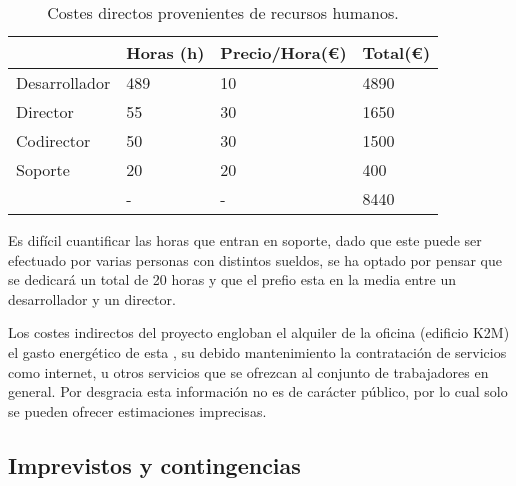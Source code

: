 \begin{table}[H]
\begin{tabular}{l|l|l|l|}
\cline{2-4}
                                                    & Horas (h) & Precio/Hora(\euro) & Total(\euro) \\ \hline
\multicolumn{1}{|l|}{Desarrollador}                 & 489       & 10               & 4890     \\ \hline
\multicolumn{1}{|l|}{Director}                      & 55        & 30               & 1650     \\ \hline
\multicolumn{1}{|l|}{Codirector}                    & 50        & 30               & 1500     \\ \hline
\multicolumn{1}{|l|}{Soporte}                       & 20        & 20               & 400      \\ \hline
\rowcolor{gray!50}
\multicolumn{1}{|l|}{Total} &    -       &  -              &  8440        \\ \hline
\end{tabular}
\caption{Costes directos provenientes de recursos humanos.}
\end{table}

Es difícil cuantificar las horas que entran en soporte, dado que este puede ser efectuado por varias personas con distintos sueldos, se ha optado por pensar que se dedicará un total de 20 horas y que el prefio esta en la media entre un desarrollador y un director.

\par\bigskip

Los costes indirectos del proyecto engloban el alquiler de la oficina (edificio K2M) el gasto energético de esta , su debido mantenimiento la contratación de servicios como internet, u otros servicios que se ofrezcan al conjunto de trabajadores en general. Por desgracia esta información no es de carácter público, por lo cual solo se pueden ofrecer estimaciones imprecisas.

\subsection{Imprevistos y contingencias}

